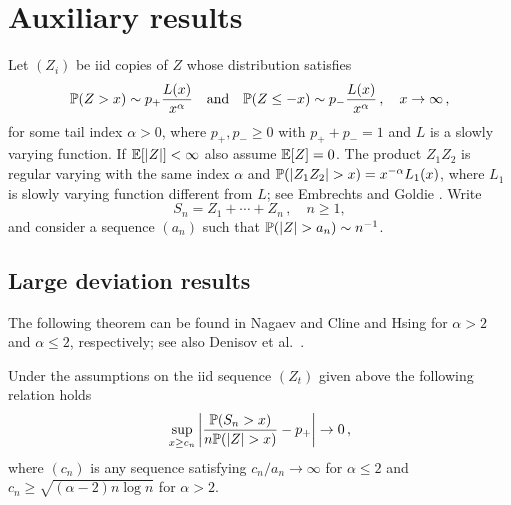 \section{Auxiliary results}\label{appendix:Ach3}

Let $(Z_i)$ be iid copies of $Z$ whose distribution satisfies
\begin{equation*}
\mathbb{P}(Z>x)\sim p_+ \dfrac{L(x)}{x^{\alpha}}\quad\mbox{and}\quad  \mathbb{P}(Z\le -x)\sim p_-
\dfrac{L(x)}{x^{\alpha}} \,,\quad x \to \infty\,,
\end{equation*}
 for some tail index $\alpha>0$,
where $p_+,p_-\ge 0$ with $p_++p_-=1$ and $L$ is a slowly varying function. If $\mathbb{E}[|Z|]<\infty$ also assume $\mathbb{E}[Z]=0$. The product $Z_1Z_2$ is regular varying with the same index $\alpha$ and $\P(|Z_1Z_2|>x)= x^{-\alpha} L_1(x)$, where $L_1$ is slowly varying function different from $L$;
see Embrechts and Goldie \cite{embrechts:goldie:1980}.
Write
\begin{equation*}
S_n=Z_1+\cdots +Z_n\,,\quad n\ge 1,
\end{equation*} and consider a sequence $(a_n)$ such that $\P(|Z|>a_n)\sim n^{-1}$.

\subsection{Large deviation results}
The following theorem can be found in
Nagaev \cite{nagaev:1979} and Cline and Hsing
\cite{cline:hsing:1998} for $\alpha>2$ and $\alpha\le 2$,
respectively; see also  Denisov et al.~\cite{denisov:dieker:shneer:2008}.
\begin{theorem}\label{thm:nagaevch3}
Under the assumptions on the iid sequence $(Z_t)$
given above the following relation holds
\begin{equation*}
\sup_{x\ge c_n}\left|\dfrac{\P(S_n>x )}{n\P(|Z|>x)} -p_+ \right|\to 0\,,
\end{equation*}
where $(c_n)$ is any sequence satisfying $c_n/a_n\to  \infty$ for
$\alpha\le 2$ and $c_n\ge \sqrt{(\alpha-2)n\log n}$ for $\alpha>2$.
\end{theorem}




